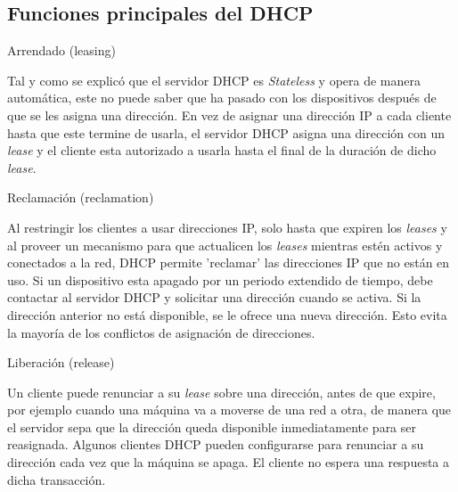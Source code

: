 \subsection{Funciones principales del DHCP} %
\label{sub:Funciones principales del DHCP}


\begin{frame}{Arrendado (leasing)} %

    Tal y como se explicó que el servidor DHCP es \textit{Stateless} y
    opera de manera automática, este no puede saber que ha pasado con los
    dispositivos después de que se les asigna una dirección. En vez de asignar una
    dirección IP a cada cliente hasta que este termine de usarla, el servidor
    DHCP asigna una dirección con un \textit{lease} y el cliente esta
    autorizado a usarla hasta el final de la duración de dicho
    \textit{lease}.\\[0.2cm]


\end{frame}

\begin{frame}{Reclamación (reclamation)} %

    Al restringir los clientes a usar direcciones IP, solo hasta que expiren
    los \textit{leases} y al proveer un mecanismo para que actualicen los
    \textit{leases} mientras estén activos y conectados a la red, DHCP permite
    'reclamar' las direcciones IP que no están en uso. Si un dispositivo esta
    apagado por un periodo extendido de tiempo, debe contactar al servidor DHCP
    y solicitar una dirección cuando se activa. Si la dirección anterior no
    está disponible, se le ofrece una nueva dirección. Esto evita la mayoría de
    los conflictos de asignación de direcciones.

\end{frame}

\begin{frame}{Liberación (release)} %

    Un cliente puede renunciar a su \textit{lease} sobre una dirección, antes
    de que expire, por ejemplo cuando una máquina va a moverse de una red a
    otra, de manera que el servidor sepa que la dirección queda disponible
    inmediatamente para ser reasignada. Algunos clientes DHCP pueden
    configurarse para renunciar a su dirección cada vez que la máquina se
    apaga. El cliente no espera una respuesta a dicha transacción.

\end{frame}

